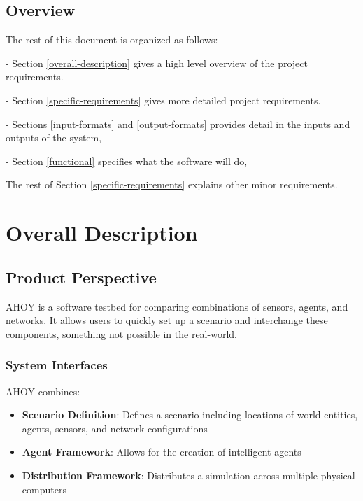 \documentclass[titlepage]{article}
\begin{document}

\subsection{Overview%
  \label{overview}%
}

The rest of this document is organized as follows: 
\begin{itemize*}
	\item[-]Section \ref{overall-description} gives a high level overview of the project requirements.  
	\item[-]Section \ref{specific-requirements} gives more detailed project requirements.  
	\item[-]Sections \ref{input-formats} and \ref{output-formats} provides detail in the inputs and outputs of the system, 
	\item[-]Section \ref{functional} specifies what the software will do, 
\end{itemize*}
The rest of Section \ref{specific-requirements} explains other minor requirements.


\section{Overall Description%
  \label{overall-description}%
}


\subsection{Product Perspective%
  \label{product-perspective}%
}

AHOY is a software testbed for comparing combinations of sensors, agents, and networks.  It allows users to quickly set up a scenario and interchange these components, something not possible in the real-world.


\subsubsection{System Interfaces%
  \label{system-interfaces}%
}

AHOY combines:
\begin{itemize}
    \item \textbf{Scenario Definition}: Defines a scenario including locations of world entities, agents, sensors, and network configurations
    \item \textbf{Agent Framework}: Allows for the creation of intelligent agents
    \item \textbf{Distribution Framework}: Distributes a simulation across multiple physical computers
\end{itemize}
\end{document}
